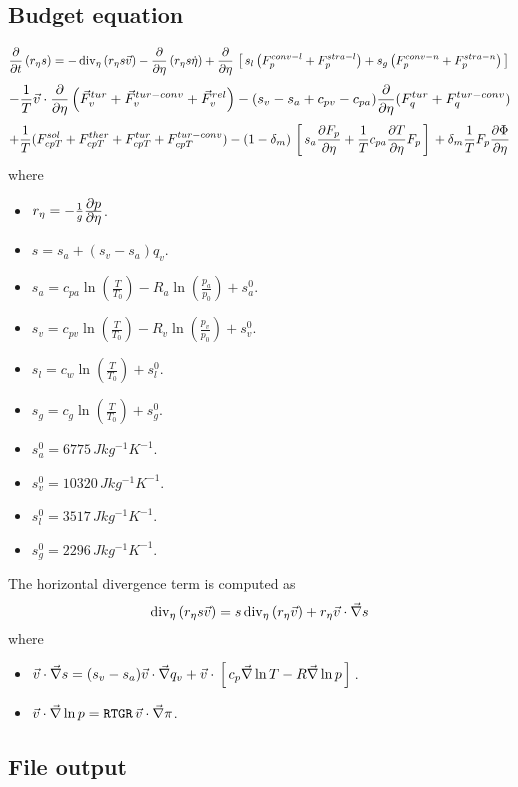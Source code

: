\subsection*{Budget equation}
$$
\frac{\displaystyle \partial }{\displaystyle \partial t}\left(r_{\eta} s\right)=
- \mathop{\rm div}\nolimits_{\eta}\left(r_{\eta} s \vec{v}\right)
- \frac{\displaystyle \partial }{\displaystyle \partial \eta}\left(r_{\eta} s \dot{\eta}\right)
+ \frac{\displaystyle \partial }{\displaystyle \partial \eta}\, \left[ \, s_l \left( F_{p}^{conv-l}+F_{p}^{stra-l} \right)
               + s_g \left( F_{p}^{conv-n}+F_{p}^{stra-n}\right) \, \right] \,
$$
$$
- \frac{1}{T}\vec{v}\cdot\frac{\displaystyle \partial }{\displaystyle \partial \eta} \left( \vec{F}_{v}^{tur}+\vec{F}_{v}^{tur-conv}+\vec{F}_{v}^{rel} \right)
- (s_v-s_a+c_{pv}-c_{pa})\frac{\displaystyle \partial }{\displaystyle \partial \eta}(F_{q}^{tur}+F_{q}^{tur-conv})
$$
$$
+ \frac{1}{T}(F_{cp T}^{sol}+F_{cp T}^{ther}+F_{cp T}^{tur}+F_{cp T}^{tur-conv})
- (1-\delta_m)\, \left[ \, s_a\frac{\displaystyle \partial F_{p}}{\displaystyle \partial \eta}+\frac{1}{T}c_{pa}\frac{\displaystyle \partial T}{\displaystyle \partial \eta}F_{p}\, \right] \,
+ \delta_m \frac{1}{T} F_{p} \frac{\displaystyle \partial \Phi}{\displaystyle \partial \eta}
$$
where
\begin{itemize}
        \item $r_{\eta}=-\frac{1}{g}\frac{\displaystyle \partial p}{\displaystyle \partial \eta}$.
        \item $s=s_a + (s_v-s_a) q_v$.
        \item $s_a=c_{pa}\ln(\frac{T}{T_0})-R_a\ln(\frac{p_a}{p_0})+s_{a}^{0}$.
        \item $s_v=c_{pv}\ln(\frac{T}{T_0})-R_v\ln(\frac{p_v}{p_0})+s_{v}^{0}$.
        \item $s_l=c_{w}\ln(\frac{T}{T_0})+s_{l}^{0}$.
        \item $s_g=c_{g}\ln(\frac{T}{T_0})+s_{g}^{0}$.
        \item $s_{a}^{0}=6775 \, J kg^{-1} K^{-1}$.
        \item $s_{v}^{0}=10320 \, J kg^{-1} K^{-1}$.
        \item $s_{l}^{0}=3517 \, J kg^{-1} K^{-1}$.
        \item $s_{g}^{0}=2296 \, J kg^{-1} K^{-1}$.
\end{itemize}
The horizontal divergence term is computed as 
\begin{displaymath} 
        \mathop{\rm div}\nolimits_{\eta}\left(r_{\eta} s \vec{v}\right)=
        s\mathop{\rm div}\nolimits_{\eta}\left(r_{\eta} \vec{v}\right)
        +r_{\eta}\vec{v}\cdot\vec{\nabla} s
\end{displaymath}
where
\begin{itemize} 
        \item $\vec{v}\cdot\vec{\nabla} s=
               (s_v-s_a)\vec{v}\cdot\vec{\nabla} q_v
               +\vec{v}\cdot\, \left[ \, c_p\vec{\nabla}\ln T-R\vec{\nabla}\ln p\, \right] \,
               $.
        \item $\vec{v}\cdot\vec{\nabla}\ln p=\mbox{{\tt RTGR}}\,\vec{v}\cdot\vec{\nabla}\pi$.
\end{itemize}
\subsection*{File output}

